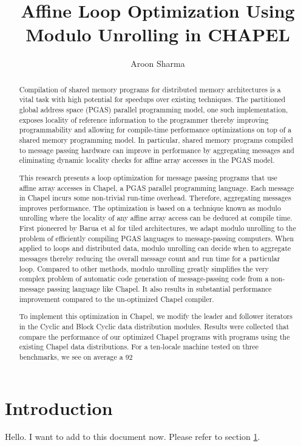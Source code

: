 \documentclass[10pt, oneside]{article}   	%
\title{\textbf{Affine Loop Optimization Using Modulo Unrolling in CHAPEL}}
\author{Aroon Sharma}
\begin{document}
\maketitle

\begin{abstract}

Compilation of shared memory programs for distributed memory architectures is a vital task with high potential for speedups over existing techniques. The partitioned global address space (PGAS) parallel programming model, one such implementation, exposes locality of reference information to the programmer thereby improving programmability and allowing for compile-time performance optimizations on top of a shared memory programming model. In particular, shared memory programs compiled to message passing hardware can improve in performance by aggregating messages and eliminating dynamic locality checks for affine array accesses in the PGAS model. 

This research presents a loop optimization for message passing programs that use affine array accesses in Chapel, a PGAS parallel programming language. Each message in Chapel incurs some non-trivial run-time overhead. Therefore, aggregating messages improves performance. The optimization is based on a technique known as modulo unrolling where the locality of any affine array access can be deduced at compile time. First pioneered by Barua et al for tiled architectures, we adapt modulo unrolling to the problem of efficiently compiling PGAS languages to message-passing computers. When applied to loops and distributed data, modulo unrolling can decide when to aggregate messages thereby reducing the overall message count and run time for a particular loop. Compared to other methods, modulo unrolling greatly simplifies the very complex problem of automatic code generation of message-passing code from a non-message passing language like Chapel. It also results in substantial performance improvement compared to the un-optimized Chapel compiler.

To implement this optimization in Chapel, we modify the leader and follower iterators in the Cyclic and Block Cyclic data distribution modules. Results were collected that compare the performance of our optimized Chapel programs with programs using the existing Chapel data distributions. For a ten-locale machine tested on three benchmarks, we see on average a 92%


\end{abstract}

\section{Introduction}\label{sec:intro}

Hello. I want to add to this document now. Please refer to section \ref{sec:intro}. 
\end{document}
